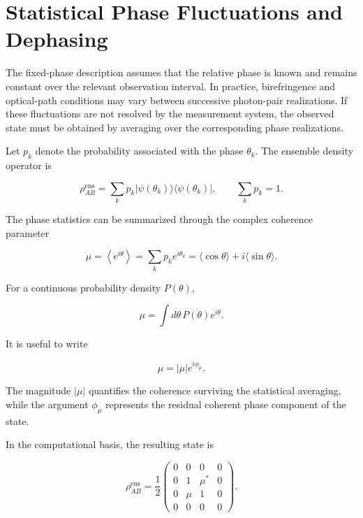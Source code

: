 \section{Statistical Phase Fluctuations and Dephasing}
\label{sec:statistical_phase_fluctuations}

The fixed-phase description assumes that the relative phase is known and remains
constant over the relevant observation interval. In practice, birefringence and
optical-path conditions may vary between successive photon-pair realizations. If
these fluctuations are not resolved by the measurement system, the observed state
must be obtained by averaging over the corresponding phase realizations.

Let \(p_k\) denote the probability associated with the phase \( \theta_k \). The
ensemble density operator is

\begin{equation}
\rho_{AB}^{\mathrm{ens}}
=
\sum_k
p_k
|\psi(\theta_k)\rangle
\langle\psi(\theta_k)|,
\qquad
\sum_k p_k=1.
\label{eq:random_phase_ensemble}
\end{equation}

The phase statistics can be summarized through the complex coherence parameter

\begin{equation}
\mu
=
\left\langle e^{i\theta}\right\rangle
=
\sum_k p_k e^{i\theta_k}
=
\langle\cos\theta\rangle
+
i\langle\sin\theta\rangle.
\label{eq:coherence_parameter_mu}
\end{equation}

For a continuous probability density \(P(\theta)\),

\begin{equation}
\mu
=
\int d\theta\,
P(\theta)e^{i\theta}.
\label{eq:continuous_coherence_parameter_mu}
\end{equation}

It is useful to write

\begin{equation}
\mu
=
|\mu|e^{i\phi_\mu}.
\label{eq:coherence_parameter_polar_form}
\end{equation}

The magnitude \( |\mu| \) quantifies the coherence surviving the statistical
averaging, while the argument \( \phi_\mu \) represents the residual coherent
phase component of the state.

In the computational basis, the resulting state is

\begin{equation}
\rho_{AB}^{\mathrm{ens}}
=
\frac{1}{2}
\begin{pmatrix}
0 & 0 & 0 & 0\\
0 & 1 & \mu^* & 0\\
0 & \mu & 1 & 0\\
0 & 0 & 0 & 0
\end{pmatrix}.
\label{eq:random_phase_density_matrix}
\end{equation}

